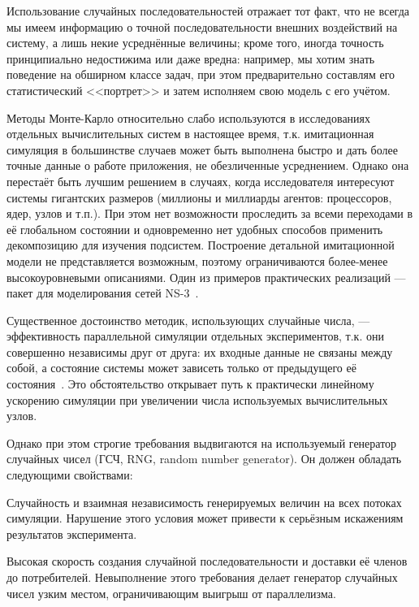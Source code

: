 Использование случайных последовательностей отражает тот факт, что не всегда мы имеем информацию о точной последовательности внешних воздействий на систему, а лишь некие усреднённые величины; кроме того, иногда точность принципиально недостижима или даже вредна: например, мы хотим знать поведение на обширном классе задач, при этом предварительно составлям его статистический <<портрет>> и затем исполняем свою модель с его учётом. 

Методы Монте-Карло относительно слабо используются в исследованиях отдельных вычислительных систем в настоящее время, т.к. имитационная симуляция в большинстве случаев может быть выполнена быстро и дать более точные данные о работе приложения, не обезличенные усреднением. Однако она перестаёт быть лучшим решением в случаях, когда исследователя интересуют системы гигантских размеров (миллионы и миллиарды агентов: процессоров, ядер, узлов и т.п.). При этом нет возможности проследить за всеми переходами в её глобальном состоянии и одновременно нет удобных способов применить декомпозицию для изучения подсистем. Построение детальной имитационной модели не представляется возможным, поэтому ограничиваются более-менее высокоуровневыми описаниями. Один из примеров практических реализаций --- пакет для моделирования сетей NS-3~\cite{ns}.

Существенное достоинство методик, использующих случайные числа, --- эффективность параллельной симуляции отдельных экспериментов, т.к. они совершенно независимы друг от друга: их входные данные не связаны между собой, а состояние системы может зависеть только от предыдущего её состояния~\cite{glinsky2011}. Это обстоятельство открывает путь к практически линейному ускорению симуляции при увеличении числа используемых вычислительных узлов.

Однако при этом строгие требования  выдвигаются на используемый генератор случайных чисел (ГСЧ, \abbr RNG, random number generator). Он должен обладать следующими свойствами:
\begin{enumerate*}
\item Случайность и взаимная независимость генерируемых величин на всех потоках симуляции. Нарушение этого условия может привести к серьёзным искажениям результатов эксперимента.
\item Высокая скорость создания случайной последовательности и доставки её членов до потребителей. Невыполнение этого требования делает генератор случайных чисел узким местом, ограничивающим выигрыш от параллелизма.
\end{enumerate*}

